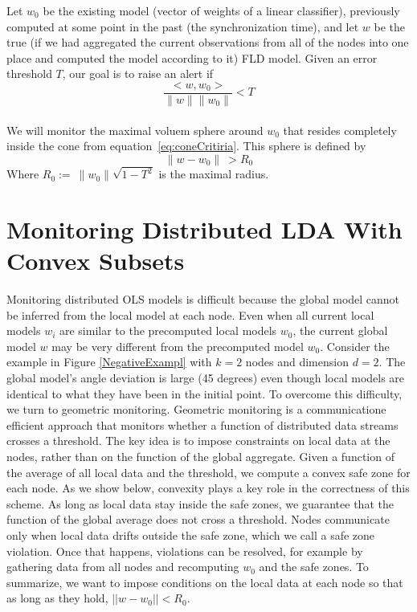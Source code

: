 \documentclass[11pt,twocolumn,varwidth=true,a4paper,fleqn]{article}
\begin{document}
Let $w_0$ be the existing model (vector of weights of a linear classifier), 
previously computed at some point in the past (the synchronization time), 
and let $w$ be the true (if we had aggregated the current observations 
from all of the nodes into one place and computed the model according to it) FLD model. 
Given an error threshold $T$, our goal is to raise an alert if
\begin{equation} \label{eq:coneCritiria}
\frac{<w,w_0>}{\parallel w \parallel \parallel w_0 \parallel}  < T
\end{equation}
\\We will monitor the maximal voluem sphere around $w_0$ that resides completely
inside the cone from equation~\ref{eq:coneCritiria}. This sphere is
defined by
\begin{equation} \label{eq:critiria}
\parallel w-w_0 \parallel \  >  R_0
\end{equation}
Where $R_0 := \  \parallel w_0 \parallel \sqrt{1-T^2}$ is the maximal radius.
\section{Monitoring Distributed LDA With Convex Subsets}
Monitoring distributed OLS models is difficult because the
global model cannot be inferred from the local model at each
node. Even when all current local models $w_i$ are similar to the precomputed
local models $w_0$, the current global model $w$ may
be very different from the precomputed model $w_0$. Consider
the example in Figure \ref{NegativeExampl} with $k = 2$ nodes and dimension $d =
2$. The global model's angle deviation is large (45 degrees) even
though local models are identical to what they have been in the initial point. 
To overcome this difficulty, we turn to geometric monitoring. Geometric monitoring
\cite{keren2014geometric, keren2012shape} is a communicatione
efficient approach that monitors whether a function of distributed
data streams crosses a threshold. The key idea is to
impose constraints on local data at the nodes, rather than
on the function of the global aggregate. Given a function of
the average of all local data and the threshold, we compute a
convex safe zone for each node. As we show below, convexity
plays a key role in the correctness of this scheme. As long
as local data stay inside the safe zones, we guarantee that
the function of the global average does not cross a threshold.
Nodes communicate only when local data drifts outside the
safe zone, which we call a safe zone violation. Once that
happens, violations can be resolved, for example by gathering
data from all nodes and recomputing $w_0$ and the safe zones.
To summarize, we want to impose conditions on the local
data at each node so that as long as they hold, $||w-w_0||<R_0$.
\end{document}
